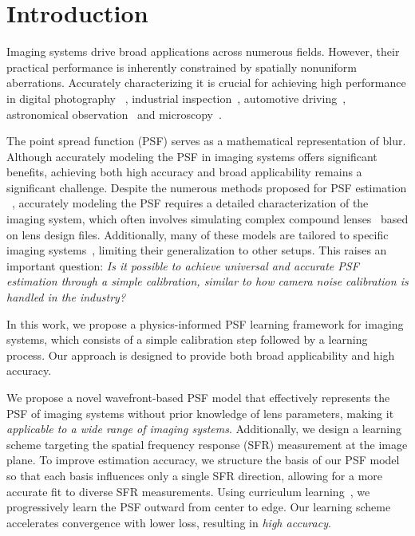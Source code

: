 
\section{Introduction}
\label{sec:intro}

Imaging systems drive broad applications across numerous fields. However, their practical performance is inherently constrained by spatially nonuniform aberrations. Accurately characterizing it is crucial for achieving high performance in digital photography ~\cite{zhang2019deep,yue2015blind,zamir2022restormer,delbracio2021polyblur,gong2024physics}, industrial inspection~\cite{wu2022integrated}, automotive driving~\cite{tseng2021differentiable}, astronomical observation~\cite{karabal2017deconvolution,guo2024direct} and microscopy~\cite{qiao2024deep,zhao2022sparse}. 

The point spread function (PSF) serves as a mathematical representation of blur. Although accurately modeling the PSF in imaging systems offers significant benefits, achieving both high accuracy and broad applicability remains a significant challenge. Despite the numerous methods proposed for PSF estimation ~\cite{jemec20172d,lin2023learning,liang2021mutual,liaudat2023rethinking,eboli2022fast,chen2021extreme,chen2022computational,qiao2024deep,shih2012image,mosleh2015camera,kee2011modeling}, accurately modeling the PSF requires a detailed characterization of the imaging system, which often involves simulating complex compound lenses~\cite{shih2012image,zhou2024optical,chen2021optical,chen2022computational} based on lens design files. Additionally, many of these models are tailored to specific imaging systems~\cite{zhou2024optical,chen2022computational}, limiting their generalization to other setups. This raises an important question: \emph{Is it possible to achieve universal and accurate PSF estimation through a simple calibration, similar to how camera noise calibration is handled in the industry?}

In this work, we propose a physics-informed PSF learning framework for imaging systems, which consists of a simple calibration step followed by a learning process. Our approach is designed to provide both broad applicability and high accuracy.

We propose a novel wavefront-based PSF model that effectively represents the PSF of imaging systems without prior knowledge of lens parameters, making it \emph{applicable to a wide range of imaging systems}. Additionally, we design a learning scheme targeting the spatial frequency response (SFR) measurement at the image plane. To improve estimation accuracy, we structure the basis of our PSF model so that each basis influences only a single SFR direction, allowing for a more accurate fit to diverse SFR measurements. Using curriculum learning~\cite{bengio2009curriculum}, we progressively learn the PSF outward from center to edge. Our learning scheme accelerates convergence with lower loss, resulting in \emph{high accuracy}.

